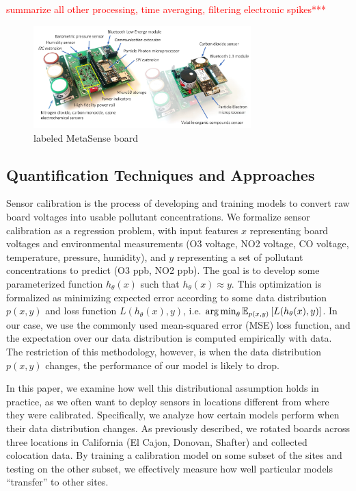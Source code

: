 \documentclass[journal abbreviation, manuscript]{copernicus}
\newcommand\todo[1]{\textcolor{red}{#1}}
\begin{document}
\todo {summarize all other processing, time averaging, filtering electronic spikes***}

\begin{figure}[H]
\centering
\includegraphics[width=0.75\textwidth]{writeup/img/metasense-platform}
\caption{labeled MetaSense board}
\label{fig:img-label}
\end{figure}

\subsection{Quantification Techniques and Approaches}

Sensor calibration is the process of developing and training models to convert raw board voltages into usable pollutant concentrations. We formalize sensor calibration as a regression problem, with input features $x$ representing board voltages and environmental measurements (O3 voltage, NO2 voltage, CO voltage, temperature, pressure, humidity), and $y$ representing a set of pollutant concentrations to predict (O3 ppb, NO2 ppb).
The goal is to develop some parameterized function $h_\theta(x)$
such that $h_\theta(x) \approx y$. This optimization is formalized as minimizing expected error according to some data distribution $p(x, y)$ and loss function $L(h_\theta(x), y)$, i.e. $\operatorname*{arg\,min}_\theta \mathbb{E}_{p(x, y)}\left[L(h_\theta(x), y)\right]$. In our case, we use the commonly used mean-squared error (MSE) loss function, and the expectation
over our data distribution is computed empirically with data.
The restriction of this methodology, however, is when the data distribution $p(x, y)$ changes, the performance of our  model is likely to drop. 

In this paper, we examine how well this distributional assumption holds in practice, as we often want to deploy sensors in locations different from where they were calibrated. Specifically, we analyze how certain models perform when their data distribution changes. As previously described, we rotated boards across three locations in California (El Cajon, Donovan, Shafter) and collected colocation data. 
By training a calibration model on some subset of the sites and testing on the other subset, we effectively measure how well particular models ``transfer'' to other sites.
\end{document}
